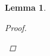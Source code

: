 \documentclass[11pt]{article} %
\newtheorem{lemma}{Lemma}
\begin{document}
\begin{lemma}
\begin{proof}
\begin{enumerate}
%
%
%
%
%
%

\end{enumerate}
\end{proof}
\end{lemma}
\end{document}
